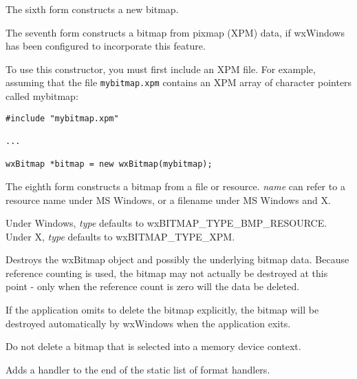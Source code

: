 The sixth form constructs a new bitmap.

The seventh form constructs a bitmap from pixmap (XPM) data, if wxWindows has been configured
to incorporate this feature.

To use this constructor, you must first include an XPM file. For
example, assuming that the file {\tt mybitmap.xpm} contains an XPM array
of character pointers called mybitmap:

\begin{verbatim}
#include "mybitmap.xpm"

...

wxBitmap *bitmap = new wxBitmap(mybitmap);
\end{verbatim}

The eighth form constructs a bitmap from a file or resource. {\it name} can refer
to a resource name under MS Windows, or a filename under MS Windows and X.

Under Windows, {\it type} defaults to wxBITMAP\_TYPE\_BMP\_RESOURCE.
Under X, {\it type} defaults to wxBITMAP\_TYPE\_XPM.





Destroys the wxBitmap object and possibly the underlying bitmap data.
Because reference counting is used, the bitmap may not actually be
destroyed at this point - only when the reference count is zero will the
data be deleted.

If the application omits to delete the bitmap explicitly, the bitmap will be
destroyed automatically by wxWindows when the application exits.

Do not delete a bitmap that is selected into a memory device context.

\label{wxbitmapaddhandler}


Adds a handler to the end of the static list of format handlers.




